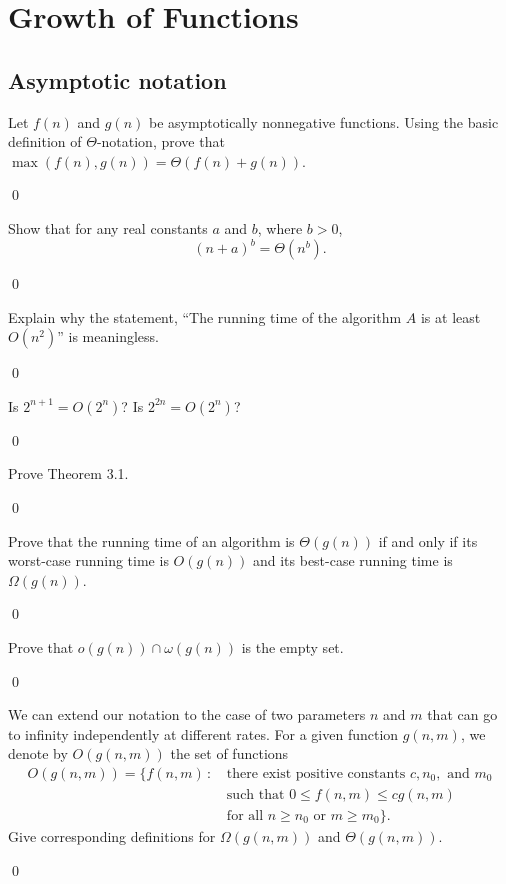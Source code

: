 \chapter{Growth of Functions}
\section{Asymptotic notation}

 Let $f(n)$ and $g(n)$ be asymptotically nonnegative functions. Using the basic definition of $\Theta$-notation, prove that $\max(f(n), g(n)) = \Theta(f(n) + g(n))$.

\sol \qed


Show that for any real constants $a$ and $b$, where $b > 0$, $$(n+a)^b = \Theta(n^b).$$

\sol \qed

 Explain why the statement, ``The running time of the algorithm $A$ is at least $O(n^2)$'' is meaningless.

\sol \qed

 Is $2^{n+1} = O(2^n)$? Is $2^{2n} = O(2^n)$?

\sol \qed

 Prove Theorem 3.1.

\pf \qed

 Prove that the running time of an algorithm is $\Theta(g(n))$ if and only if its worst-case running time is $O(g(n))$ and its best-case running time is $\Omega(g(n))$.

\pf \qed

 Prove that $o(g(n)) \cap \omega(g(n))$ is the empty set.

\pf \qed

 We can extend our notation to the case of two parameters $n$ and $m$ that can go to infinity independently at different rates. For a given function $g(n,m)$, we denote by $O(g(n,m))$ the set of functions
\begin{align*}
    O(g(n,m)) = \{f(n,m) \,  : \, & \text{there exist positive constants } c, n_0, \text{ and } m_0 \\
    & \text{such that } 0 \leq f(n,m) \leq cg(n,m) \\
    & \text{for all }n \geq n_0 \text{ or } m \geq m_0\}.
\end{align*}
Give corresponding definitions for $\Omega(g(n,m))$ and $\Theta(g(n,m))$.

\sol \qed

